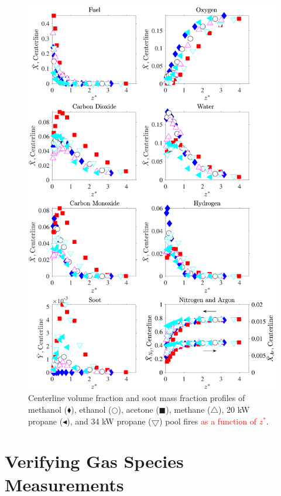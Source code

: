 \documentclass[12pt]{article}
\begin{document}
\begin{figure}[!]
	\centering
\includegraphics[width=12.5cm,keepaspectratio]{OVERALL_Fuel_Comparison.pdf}
	\caption[Centerline volume fraction and soot mass fraction profiles]{Centerline volume fraction and soot mass fraction profiles of methanol ($\blacklozenge$), ethanol ($\bigcirc$), acetone ($\blacksquare$), methane ($\triangle$), 20 kW propane ($\blacktriangleleft$), and 34 kW propane ($\bigtriangledown$) pool fires \textcolor{red}{ as a function of $z^*$}.}
	\label{fig:Fuel_Comparison}
\end{figure}


\clearpage

\section{Verifying Gas Species Measurements}
\label{ssec:Verifying_Vol_Frac_Measurements}
\end{document}
